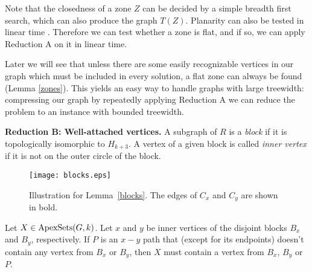 \documentclass{llncs}
\begin{document}
Note that the closedness of a zone $Z$ can be decided
by a simple breadth first search, which can also produce the graph $T(Z)$.
Planarity can also be tested in linear time \cite{hop74}.
Therefore we can test whether a zone is flat, and if so, we can apply Reduction A on it in linear time.

Later we will see that unless there are some easily recognizable vertices in our graph
which must be included in every solution, a flat zone can always be found (Lemma \ref{zones}).
This yields an easy way to handle graphs with large treewidth:
compressing our graph by repeatedly applying Reduction A we can reduce the problem
to an instance with bounded treewidth.

\textbf{Reduction B: Well-attached vertices.}
A subgraph of $R$ is a \emph{block} if it is topologically isomorphic to $H_{k+3}$.
A vertex of a given block is called \emph{inner vertex}
if it is not on the outer circle of the block.

\begin{figure}[t]
\begin{center}
\texttt{[image: blocks.eps]}
\end{center}
\caption{Illustration for Lemma~\ref{blocks}. The edges of $C_x$ and $C_y$ are shown in bold.}
\label{fig_blocks}
\end{figure}

\begin{lemma}
\label{blocks}
Let $X \in \textup{ApexSets}(G,k)$.
Let $x$ and $y$ be inner vertices of the disjoint blocks $B_x$ and $B_y$, respectively.
If $P$ is an $x-y$ path that (except for its endpoints) doesn't contain any vertex from $B_x$ or $B_y$, then
$X$ must contain a vertex from $B_x$, $B_y$ or $P$.
\end{lemma}
\end{document}
